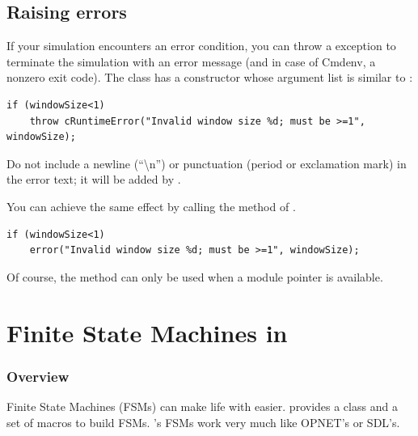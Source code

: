 \subsection{Raising errors}

If your simulation encounters an error condition, you can throw a
 exception to terminate the simulation with
an error message (and in case of Cmdenv, a nonzero exit code).
The  class has a constructor whose argument list
is similar to :

\begin{verbatim}
if (windowSize<1)
    throw cRuntimeError("Invalid window size %d; must be >=1", windowSize);
\end{verbatim}

Do not include a newline (``{\textbackslash}n'') or punctuation (period
or exclamation mark) in the error text; it will be added by {\opp}.

You can achieve the same effect by calling the  method of
.

\begin{verbatim}
if (windowSize<1)
    error("Invalid window size %d; must be >=1", windowSize);
\end{verbatim}

Of course, the  method can only be used when a module pointer
is available.



\section{Finite State Machines in {\opp}}
\label{sec:simple-modules:fsm}

\subsubsection{Overview}


Finite State Machines (FSMs)
can make life with  easier. {\opp} provides a
class and a set of macros to build FSMs. {\opp}'s FSMs work very much
like OPNET's or SDL's.


